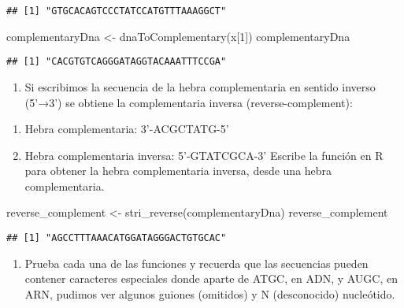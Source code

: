 \documentclass[
]{article}
\newenvironment{Shaded}{\begin{snugshade}}{\end{snugshade}}
\newcommand{\DecValTok}[1]{\textcolor[rgb]{0.00,0.00,0.81}{#1}}
\newcommand{\FunctionTok}[1]{\textcolor[rgb]{0.00,0.00,0.00}{#1}}
\newcommand{\NormalTok}[1]{#1}
\newcommand{\OtherTok}[1]{\textcolor[rgb]{0.56,0.35,0.01}{#1}}
\providecommand{\tightlist}{%
  \setlength{\itemsep}{0pt}\setlength{\parskip}{0pt}}
\begin{document}
\begin{verbatim}
## [1] "GTGCACAGTCCCTATCCATGTTTAAAGGCT"
\end{verbatim}

\begin{Shaded}
\begin{Highlighting}[]
\NormalTok{complementaryDna }\OtherTok{\textless{}{-}} \FunctionTok{dnaToComplementary}\NormalTok{(x[}\DecValTok{1}\NormalTok{])}
\NormalTok{complementaryDna}
\end{Highlighting}
\end{Shaded}

\begin{verbatim}
## [1] "CACGTGTCAGGGATAGGTACAAATTTCCGA"
\end{verbatim}

\begin{enumerate}
\def\labelenumi{\arabic{enumi}.}
\setcounter{enumi}{7}
\tightlist
\item
  Si escribimos la secuencia de la hebra complementaria en sentido
  inverso (5'→3') se obtiene la complementaria inversa
  (reverse-complement):
\end{enumerate}

\begin{enumerate}
\def\labelenumi{\alph{enumi}.}
\tightlist
\item
  Hebra complementaria: 3'-ACGCTATG-5'
\item
  Hebra complementaria inversa: 5'-GTATCGCA-3' Escribe la función en R
  para obtener la hebra complementaria inversa, desde una hebra
  complementaria.
\end{enumerate}

\begin{Shaded}
\begin{Highlighting}[]
\NormalTok{reverse\_complement }\OtherTok{\textless{}{-}} \FunctionTok{stri\_reverse}\NormalTok{(complementaryDna)}
\NormalTok{reverse\_complement}
\end{Highlighting}
\end{Shaded}

\begin{verbatim}
## [1] "AGCCTTTAAACATGGATAGGGACTGTGCAC"
\end{verbatim}

\begin{enumerate}
\def\labelenumi{\arabic{enumi}.}
\setcounter{enumi}{8}
\tightlist
\item
  Prueba cada una de las funciones y recuerda que las secuencias pueden
  contener caracteres especiales donde aparte de ATGC, en ADN, y AUGC,
  en ARN, pudimos ver algunos guiones (omitidos) y N (desconocido)
  nucleótido.
\end{enumerate}
\end{document}
